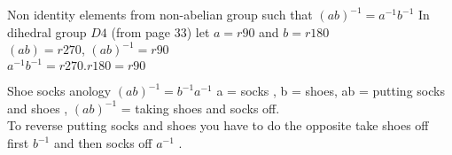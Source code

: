 \documentclass[12pt]{article}
\newenvironment{faq}{\begin{description}[style=nextline]}{\end{description}}
\begin{document}
\begin{faq}
\item[Non identity elements from non-abelian group such that $(ab)^{-1} = a^{-1} b^{-1}$]
  In dihedral group $D4$ (from page 33)
  let $a = r90$ and $b=r180$ \\
  $(ab) = r270$,  $(ab)^{-1} = r90$ \\
  $a^{-1}b^{-1} = r270.r180 = r90$

\item[Shoe socks anology $(ab)^{-1} = b^{-1}a^{-1}$]
  a = socks , b = shoes, ab = putting socks and shoes ,  $(ab)^{-1}$ = taking shoes and socks off. \\
  To reverse putting socks and shoes you have to do the opposite take shoes off first $b^{-1}$  and then socks off $a^{-1}$ .

\end{faq} 
\end{document}
